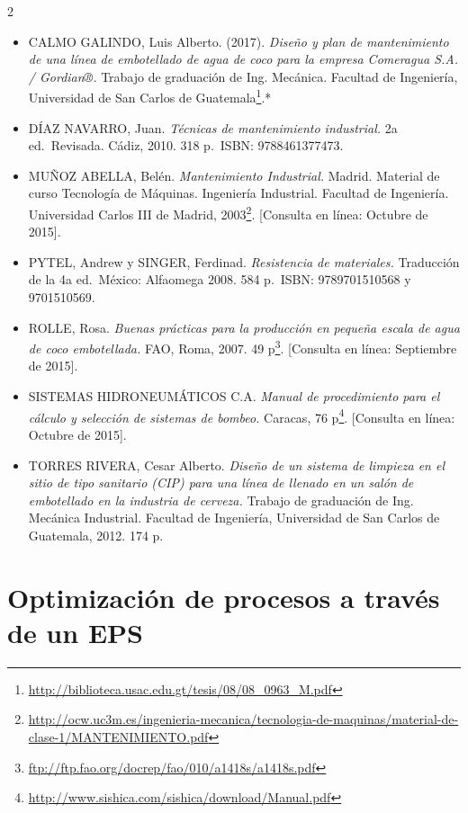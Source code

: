 \documentclass[11pt,spanish,Letterpaper,openany]{book}
\let\rmarkdownfootnote\footnote%
\def\footnote{\protect\rmarkdownfootnote}
\begin{document}
\begin {multicols}{2}
\begin{itemize}
\item
  CALMO GALINDO, Luis Alberto. (2017). \emph{Diseño y plan de mantenimiento de una línea de embotellado de agua de coco para la empresa Comeragua S.A. / Gordian®.} Trabajo de graduación de Ing. Mecánica. Facultad de Ingeniería, Universidad de San Carlos de Guatemala\footnote{\url{http://biblioteca.usac.edu.gt/tesis/08/08_0963_M.pdf}}.*
\item
  DÍAZ NAVARRO, Juan. \emph{Técnicas de mantenimiento industrial.} 2a ed.~Revisada. Cádiz, 2010. 318 p.~ISBN: 9788461377473.
\item
  MUÑOZ ABELLA, Belén. \emph{Mantenimiento Industrial.} Madrid. Material de curso Tecnología de Máquinas. Ingeniería Industrial. Facultad de Ingeniería. Universidad Carlos III de Madrid, 2003\footnote{\url{http://ocw.uc3m.es/ingenieria-mecanica/tecnologia-de-maquinas/material-de-clase-1/MANTENIMIENTO.pdf}}. {[}Consulta en línea: Octubre de 2015{]}.
\item
  PYTEL, Andrew y SINGER, Ferdinad. \emph{Resistencia de materiales.} Traducción de la 4a ed.~México: Alfaomega 2008. 584 p.~ISBN: 9789701510568 y 9701510569.
\item
  ROLLE, Rosa. \emph{Buenas prácticas para la producción en pequeña escala de agua de coco embotellada.} FAO, Roma, 2007. 49 p\footnote{\url{ftp://ftp.fao.org/docrep/fao/010/a1418s/a1418s.pdf}}. {[}Consulta en línea: Septiembre de 2015{]}.
\item
  SISTEMAS HIDRONEUMÁTICOS C.A. \emph{Manual de procedimiento para el cálculo y selección de sistemas de bombeo.} Caracas, 76 p\footnote{\url{http://www.sishica.com/sishica/download/Manual.pdf}}. {[}Consulta en línea: Octubre de 2015{]}.
\item
  TORRES RIVERA, Cesar Alberto. \emph{Diseño de un sistema de limpieza en el sitio de tipo sanitario (CIP) para una línea de llenado en un salón de embotellado en la industria de cerveza.} Trabajo de graduación de Ing. Mecánica Industrial. Facultad de Ingeniería, Universidad de San Carlos de Guatemala, 2012. 174 p.
\end{itemize}

\end {multicols}

\hypertarget{rherrera}{%
\chapter{Optimización de procesos a través de un EPS}\label{rherrera}}
\end{document}
